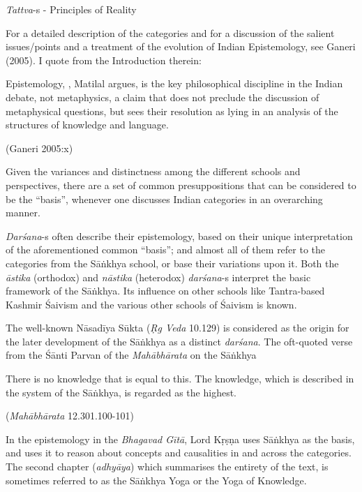 {\sl Tattva}-s - Principles of Reality

For a detailed description of the categories and for a discussion of the salient issues/points and a treatment of the evolution of Indian Epistemology, see Ganeri (2005). I quote from the Introduction therein:
\begin{myquote}
Epistemology, , Matilal argues, is the key philosophical discipline in the Indian debate, not metaphysics, a claim that does not preclude the discussion of metaphysical questions, but sees their resolution as lying in an analysis of the structures of knowledge and language.

\hfill (Ganeri 2005:x)
\end{myquote}

Given the variances and distinctness among the different schools and perspectives, there are a set of common presuppositions that can be considered to be the ``basis'', whenever one discusses Indian categories in an overarching manner.

{\sl Darśana}-s often describe their epistemology, based on their unique interpretation of the aforementioned common ``basis''; and almost all of them refer to the categories from the Sāṅkhya school, or base their variations upon it. Both the {\sl āstika} (orthodox) and {\sl nāstika} (heterodox) {\sl darśana}-s interpret the basic framework of the Sāṅkhya. Its influence on other schools like Tantra-based Kashmir Śaivism and the various other schools of Śaivism is known.

The well-known Nāsadīya Sūkta ({\sl Ṛg Veda} 10.129) is considered as the origin for the later development of the Sāṅkhya as a distinct {\sl darśana}. The oft-quoted verse from the Śānti Parvan of the {\sl Mahābhārata} on the Sāṅkhya
\begin{myquote}
There is no knowledge that is equal to this. The knowledge, which is described in the system of the Sāṅkhya, is regarded as the highest.

\hfill ({\sl Mahābhārata} 12.301.100-101)
\end{myquote}

In the epistemology in the {\sl Bhagavad Gītā}, Lord Kṛṣṇa uses Sāṅkhya as the basis, and uses it to reason about concepts and causalities in and across the categories. The second chapter ({\sl adhyāya}) which summarises the entirety of the text, is sometimes referred to as the Sāṅkhya Yoga or the Yoga of Knowledge. 

